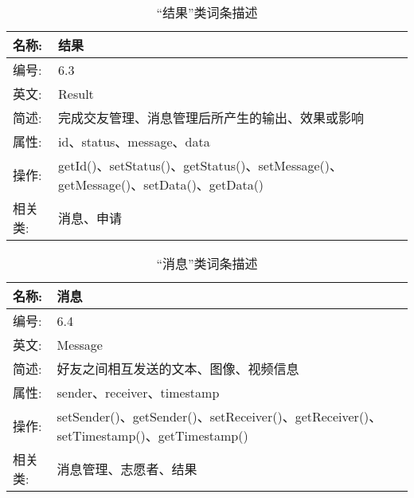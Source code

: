 \begin{table}[H]  
\caption{“结果”类词条描述}  
\begin{center}  
    \begin{tabular}{l p{11cm}} 
        \hline
        \quad 名称:  &  结果 \\
        \hline
        \quad 编号:  & 6.3 \\
        \hline
        \quad 英文:  &  Result \\
        \hline
        \quad 简述:  & 完成交友管理、消息管理后所产生的输出、效果或影响 \\
        \hline
        \quad 属性:  & id、status、message、data\\
        \hline
        \quad 操作:  & getId()、setStatus()、getStatus()、setMessage()、getMessage()、setData()、getData() \\
        \hline
        \quad 相关类:  & 消息、申请 \\
        \hline
    \end{tabular}
\end{center}
\end{table}

\begin{table}[H]  
\caption{“消息”类词条描述}  
\begin{center}  
    \begin{tabular}{l p{11cm}} 
        \hline
        \quad 名称:  &  消息 \\
        \hline
        \quad 编号:  & 6.4 \\
        \hline
        \quad 英文:  &  Message \\
        \hline
        \quad 简述:  & 好友之间相互发送的文本、图像、视频信息 \\
        \hline
        \quad 属性:  & sender、receiver、timestamp \\
        \hline
        \quad 操作:  & setSender()、getSender()、setReceiver()、getReceiver()、setTimestamp()、getTimestamp()\\
        \hline
        \quad 相关类:  & 消息管理、志愿者、结果\\
        \hline
    \end{tabular}
\end{center}
\end{table}



